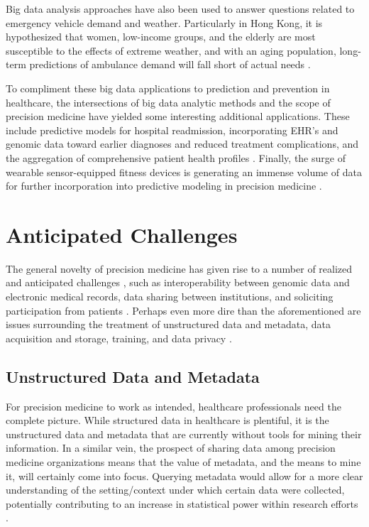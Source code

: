 Big data analysis approaches have also been used to answer questions related to emergency vehicle demand and weather. 
Particularly in Hong Kong, it is hypothesized that women, low-income groups, and the elderly are most susceptible to the 
effects of extreme weather, and with an aging population, long-term predictions of ambulance demand will fall short of 
actual needs \cite{Wong2015}.

To compliment these big data applications to prediction and prevention in healthcare, the intersections of big data analytic 
methods and the scope of precision medicine have yielded some interesting additional applications. These include predictive 
models for hospital readmission, incorporating EHR's and genomic data toward earlier diagnoses and reduced treatment 
complications, and the aggregation of comprehensive patient health profiles \cite{Leff2015}. Finally, the surge of wearable 
sensor-equipped fitness devices is generating an immense volume of data for further incorporation into predictive modeling 
in precision medicine \cite{ehealth2017}.

\section{Anticipated Challenges}

The general novelty of precision medicine has given rise to a number of realized and anticipated challenges \cite{Leff2015} 
\cite{He2017}, such as interoperability between genomic data and electronic medical records, data sharing between 
institutions, and soliciting participation from patients \cite{ehealth2017}. Perhaps even more dire than the aforementioned 
are issues surrounding the treatment of unstructured data and metadata, data acquisition and storage, training, and data 
privacy \cite{ehealth2017} \cite{He2017}.

\subsection{Unstructured Data and Metadata}

For precision medicine to work as intended, healthcare professionals need the complete picture. While structured data in 
healthcare is plentiful, it is the unstructured data and metadata that are currently without tools for mining their 
information. In a similar vein, the prospect of sharing data among precision medicine organizations means that the value of 
metadata, and the means to mine it, will certainly come into focus. Querying metadata would allow for a more clear 
understanding of the setting/context under which certain data were collected, potentially contributing to an increase in 
statistical power within research efforts \cite{ehealth2017}.

